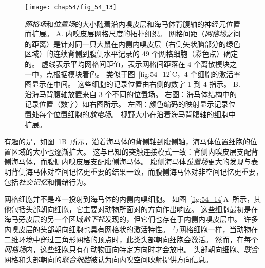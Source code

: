 \begin{figure}[htbp]
	\centering
	\texttt{[image: chap54/fig\_54\_13]}
	\caption{\textit{网格场}和\textit{位置场}的大小随着沿内嗅皮层和海马体背腹轴的神经元位置而扩展。
		A. 内嗅皮层网格尺度的拓扑组织。
		网格间距（\textit{网格场}之间的距离）是针对同一只大鼠在内侧内嗅皮层（右侧矢状脑部分的绿色区域）的连续背侧到腹侧水平记录的 49 个网格细胞（彩色点）确定的。
		虚线表示平均网格间距值，表示网格间距落在 4 个离散模块之一中，点根据模块着色。
		类似于图~\ref{fig:54_12}C，4 个细胞的激活率图显示在中间。
		这些细胞的记录位置由右侧的数字 1 到 4 指示\cite{stensola2012entorhinal}。
		B. 沿海马背腹轴放置来自 3 个不同的位置场。
		右图：海马体结构中的记录位置（数字）如右图所示。
		左图：颜色编码的映射显示记录位置处每个位置细胞的\textit{放电场}。
		视野大小在沿着海马背腹轴的细胞中扩展\cite{kjelstrup2008finite}。}
	\label{fig:54_13}
\end{figure}


有趣的是，如图~\ref{fig:54_13}B~所示，沿着海马体的背侧轴到腹侧轴，海马体位置细胞的位置区域的大小也逐渐扩大。
这与已知的突触连接模式一致：背侧内嗅皮层支配背侧海马体，而腹侧内嗅皮层支配腹侧海马体。
腹侧海马体\textit{位置场}更大的发现与表明背侧海马体对空间记忆更重要的结果一致，而腹侧海马体对非空间记忆更重要，包括\textit{社交记忆}和情绪行为。


网格细胞并不是唯一投射到海马体的内侧内嗅细胞。
如图~\ref{fig:54_14}A~所示，其他包括头部朝向细胞，它主要对动物所面对的方向作出响应。
这些细胞最初是在海马旁皮层的另一个区域\textit{前下托}发现的，但它们也存在于内侧内嗅皮层中。
许多内嗅皮层的头部朝向细胞也具有网格状的激活特性。
与网格细胞一样，当动物在二维环境中穿过三角形网格的顶点时，此类头部朝向细胞会激活。
然而，在每个\textit{网格场}内，这些细胞只有在动物面向特定方向时才会放电。
头部朝向细胞、\textit{联合}网格和头部朝向的\textit{联合细胞}被认为向内嗅空间映射提供方向信息。


